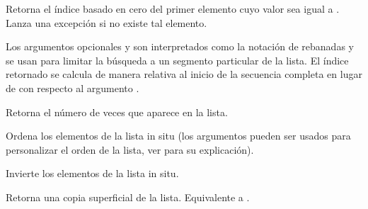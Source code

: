 \documentclass[a5paper,10pt,spanish]{sphinxmanual}
\begin{document}
\begin{fulllineitems}
\sphinxAtStartPar
Retorna el índice basado en cero del primer elemento cuyo valor sea igual a . Lanza una excepción  si no existe tal elemento.

\sphinxAtStartPar
Los argumentos opcionales  y  son interpretados como la notación de rebanadas y se usan para limitar la búsqueda a un segmento particular de la lista. El índice retornado se calcula de manera relativa al inicio de la secuencia completa en lugar de con respecto al argumento .

\end{fulllineitems}



\begin{fulllineitems}
\sphinxAtStartPar
Retorna el número de veces que  aparece en la lista.

\end{fulllineitems}



\begin{fulllineitems}
\sphinxAtStartPar
Ordena los elementos de la lista in situ (los argumentos pueden ser usados para personalizar el orden de la lista, ver  para su explicación).

\end{fulllineitems}



\begin{fulllineitems}
\sphinxAtStartPar
Invierte los elementos de la lista in situ.

\end{fulllineitems}



\begin{fulllineitems}
\sphinxAtStartPar
Retorna una copia superficial de la lista. Equivalente a .

\end{fulllineitems}
\end{document}
